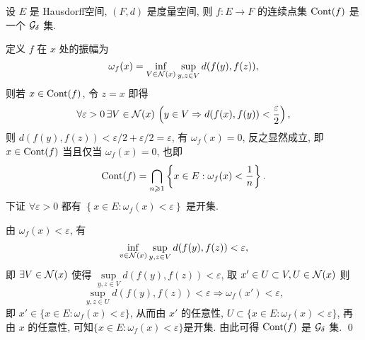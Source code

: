 	\begin{Lemma}
		设 $ E $ 是 Hausdorff空间,  $ (F, d) $ 是度量空间, 则 $ f : E\to F $ 的连续点集 $ \operatorname{Cont}(f) $ 是一个 $ \mathcal{G}_{\delta} $ 集.
		\end{Lemma}
	\begin{Proof}
		定义 $ f $ 在 $ x $ 处的振幅为
		\[
			\omega_{f}(x)=\inf_{V\in\mathcal{N}(x)}\sup_{y, z\in V}d(f(y), f(z)),
		\]
		则若 $ x\in \operatorname{Cont}(f) $, 令 $ z=x $ 即得
		\[
			\forall\varepsilon >0\,\exists V\in\mathcal{N}(x)\,\left(y\in V\Rightarrow d(f(x), f(y))<\frac{\varepsilon}{2}\right),
		\]
		则 $ d(f(y), f(z))<\varepsilon/2+\varepsilon/2=\varepsilon $, 有 $ \omega_{f}(x)=0 $, 反之显然成立, 即 $ x\in\operatorname{Cont}(f) $ 当且仅当 $ \omega_{f}(x)=0 $, 也即
		\[
			\operatorname{Cont}(f)=\bigcap_{n\geqslant1}\left\{ x\in E : \omega_{f}(x)<\frac{1}{n} \right\}.
		\]
		下证 $ \forall \varepsilon>0 $ 都有 $ \left\{ x\in E: \omega_{f}(x)<\varepsilon \right\} $ 是开集.

		由 $ \omega_{f}(x)<\varepsilon $, 有
		\[
			\inf_{v\in\mathcal{N}(x)}\sup_{y, z\in V}d(f(y), f(z))<\varepsilon,
		\]
		即 $ \exists V\in\mathcal{N}(x) $ 使得 $ \sup\limits_{y, z\in V}d(f(y), f(z))<\varepsilon $, 取 $ x'\in U\subset V, U\in \mathcal{N}(x) $ 则
		\[
			\sup_{y, z\in U}d(f(y), f(z))<\varepsilon \Longrightarrow \omega_{f}(x')<\varepsilon,
		\]
		即 $ x'\in\{ x\in E : \omega_{f}(x)<\varepsilon \} $, 从而由 $ x' $ 的任意性, $ U\subset\{ x\in E : \omega_{f}(x)<\varepsilon \}  $, 再由 $ x $ 的任意性, 可知$\{ x\in E : \omega_{f}(x)<\varepsilon \}$是开集. 由此可得 $ \operatorname{Cont}(f) $ 是 $ \mathcal{G}_{\delta} $ 集. \qed
	\end{Proof}
		
